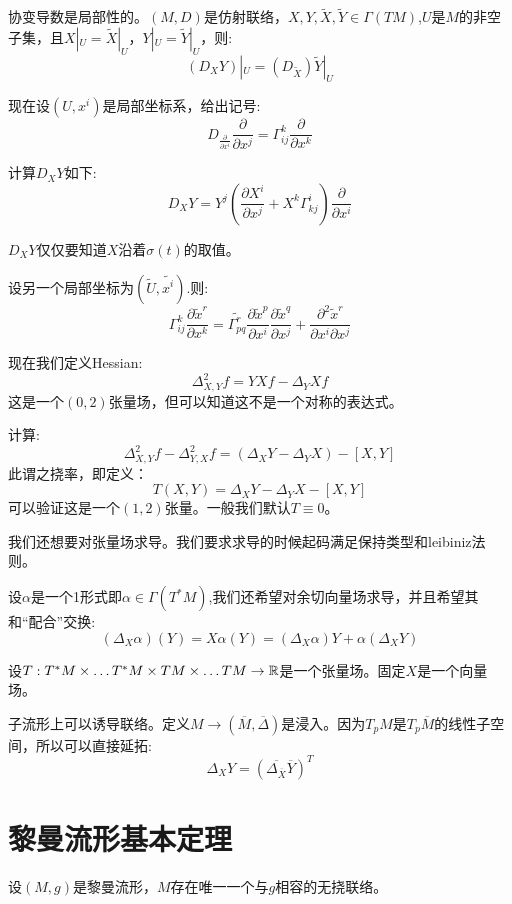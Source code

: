     协变导数是局部性的。$(M,D)$是仿射联络，$X,Y,\tilde{X},\tilde{Y} \in \Gamma(TM)$,$U$是$M$的非空子集，且$X|_U=\tilde{X}|_U$，$Y|_U=\tilde{Y}|_U$，则:
    $$
    (D_X Y)|_U=(D_{\tilde{X}})\tilde{Y}|_U
    $$
    
    现在设$(U,x^i)$是局部坐标系，给出记号:
    $$
    D_{\frac{\partial}{\partial x^i}}\frac{\partial }{\partial x^j}=\Gamma_{ij}^k \frac{\partial}{\partial x^k}
    $$

    计算$D_X Y$如下:
    $$
    D_X Y=Y^j (\frac{\partial X^i}{\partial x^j}+X^k \Gamma_{kj}^i)\frac{\partial}{\partial x^i}
    $$
    
    $D_X Y$仅仅要知道$X$沿着$\sigma(t)$的取值。
    \begin{proposition}[联络系数的变换规律]
         设另一个局部坐标为$(\tilde{U},\tilde{x^i})$.则:
         $$
         \Gamma_{ij}^k \frac{\partial \tilde{x}^r}{\partial x^k }=\tilde{\Gamma_{pq}^r} \frac{\partial \tilde{x}^p}{\partial x^i}\frac{\partial \tilde{x}^q}{\partial x^j}+\frac{\partial^2 \tilde{x}^r}{\partial x^i\partial x^j}
         $$
    \end{proposition}

    现在我们定义Hessian:
    $$
    \Delta^2_{X,Y}f=YXf-\Delta_Y X f
    $$
    这是一个$(0,2)$张量场，但可以知道这不是一个对称的表达式。
    
    计算:
    $$
    \Delta_{X,Y}^2 f-\Delta_{Y,X}^2 f=(\Delta_X Y-\Delta_Y X)-[X,Y]
    $$
    此谓之挠率，即定义：
    $$
    T(X,Y)=\Delta_X Y-\Delta_Y X-[X,Y]
    $$
    可以验证这是一个$(1,2)$张量。一般我们默认$T\equiv 0$。

    我们还想要对张量场求导。我们要求求导的时候起码满足保持类型和leibiniz法则。

    设$\alpha$是一个1形式即$\alpha \in \Gamma(T^*M)$,我们还希望对余切向量场求导，并且希望其和“配合”交换:
    $$
    (\Delta_X \alpha)(Y)=X \alpha(Y)=(\Delta_X \alpha)Y+\alpha(\Delta_X Y)
    $$

    \begin{definition}
        设$T: T^*M \times \dots T^*M \times TM \times \dots TM \to \mathbb{R}$是一个张量场。固定$X$是一个向量场。
    \end{definition}
    
    子流形上可以诱导联络。定义$M \to (\overline{M},\overline{\Delta})$是浸入。因为$T_p M$是$T_p\overline{M}$的线性子空间，所以可以直接延拓:
    $$
    \Delta_X Y=(\overline{\Delta_{\overline{X}}}\overline{Y})^T
    $$
    \section{黎曼流形基本定理}
    \begin{theorem}
       设$(M,g)$是黎曼流形，$M$存在唯一一个与$g$相容的无挠联络。
    \end{theorem}
    
